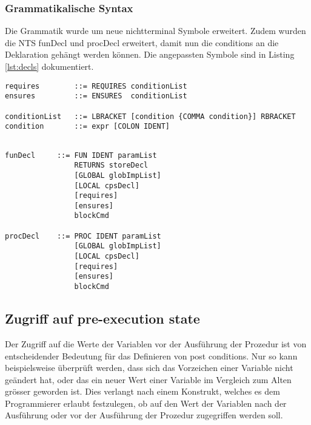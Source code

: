 \subsubsection{Grammatikalische Syntax}
Die Grammatik wurde um neue nichtterminal Symbole erweitert. Zudem wurden die NTS funDecl und 
procDecl erweitert, damit nun die conditions an die Deklaration gehängt werden können. Die angepassten
Symbole sind in Listing \ref{lst:decls} dokumentiert.
\newline
\begin{lstlisting}[caption=Neue nichtterminal Symbole]
requires        ::= REQUIRES conditionList
ensures         ::= ENSURES  conditionList

conditionList   ::= LBRACKET [condition {COMMA condition}] RBRACKET
condition       ::= expr [COLON IDENT]

\end{lstlisting}

\begin{lstlisting}[caption=Angepasste nichtterminal Symbole,label=lst:decls]

funDecl     ::= FUN IDENT paramList
                RETURNS storeDecl
                [GLOBAL globImpList]
                [LOCAL cpsDecl] 
                [requires]
                [ensures]
                blockCmd

procDecl    ::= PROC IDENT paramList
                [GLOBAL globImpList]
                [LOCAL cpsDecl]
                [requires]
                [ensures]
                blockCmd

\end{lstlisting}


\subsection{Zugriff auf pre-execution state}

Der Zugriff auf die Werte der Variablen vor der Ausführung der Prozedur ist 
von entscheidender Bedeutung für das Definieren von post conditions. Nur so 
kann beispielsweise überprüft werden, dass sich das Vorzeichen einer Variable
nicht geändert hat, oder das ein neuer Wert einer Variable im Vergleich zum 
Alten grösser geworden ist. Dies verlangt nach einem Konstrukt, welches 
es dem Programmierer erlaubt festzulegen, ob auf den Wert der Variablen
nach der Ausführung oder vor der Ausführung der Prozedur zugegriffen werden soll.

